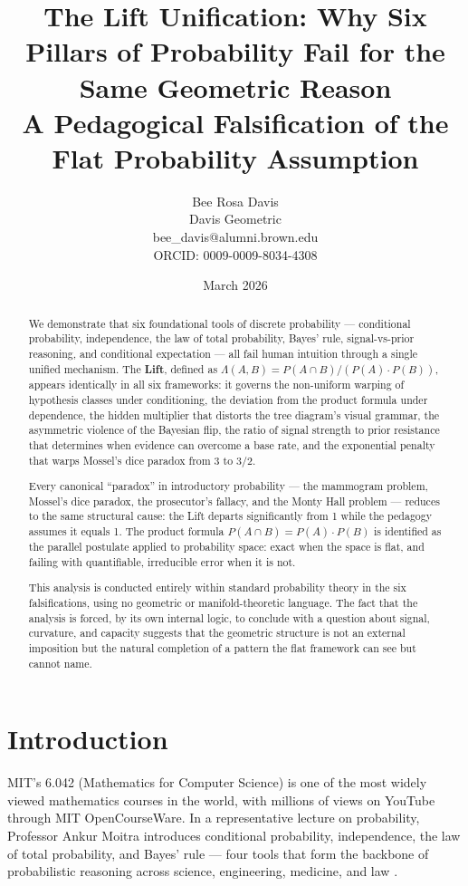 \documentclass[12pt]{article}
\title{\textbf{The Lift Unification: Why Six Pillars of Probability Fail for the Same Geometric Reason}\\[12pt]
\large A Pedagogical Falsification of the Flat Probability Assumption}
\author{Bee Rosa Davis\\
{\small Davis Geometric}\\
{\small bee\_davis@alumni.brown.edu}\\
{\small ORCID: 0009-0009-8034-4308}}
\date{March 2026}
\begin{document}
\maketitle

\begin{abstract}
We demonstrate that six foundational tools of discrete probability --- conditional probability, independence, the law of total probability, Bayes' rule, signal-vs-prior reasoning, and conditional expectation --- all fail human intuition through a single unified mechanism. The \textbf{Lift}, defined as $\Lambda(A,B) = P(A \cap B) / (P(A) \cdot P(B))$, appears identically in all six frameworks: it governs the non-uniform warping of hypothesis classes under conditioning, the deviation from the product formula under dependence, the hidden multiplier that distorts the tree diagram's visual grammar, the asymmetric violence of the Bayesian flip, the ratio of signal strength to prior resistance that determines when evidence can overcome a base rate, and the exponential penalty that warps Mossel's dice paradox from 3 to $3/2$.

Every canonical ``paradox'' in introductory probability --- the mammogram problem, Mossel's dice paradox, the prosecutor's fallacy, and the Monty Hall problem --- reduces to the same structural cause: the Lift departs significantly from 1 while the pedagogy assumes it equals 1. The product formula $P(A \cap B) = P(A) \cdot P(B)$ is identified as the parallel postulate applied to probability space: exact when the space is flat, and failing with quantifiable, irreducible error when it is not.

This analysis is conducted entirely within standard probability theory in the six falsifications, using no geometric or manifold-theoretic language. The fact that the analysis is forced, by its own internal logic, to conclude with a question about signal, curvature, and capacity suggests that the geometric structure is not an external imposition but the natural completion of a pattern the flat framework can see but cannot name.
\end{abstract}

\tableofcontents

\newpage

\section{Introduction}

MIT's 6.042 (Mathematics for Computer Science) is one of the most widely viewed mathematics courses in the world, with millions of views on YouTube through MIT OpenCourseWare. In a representative lecture on probability, Professor Ankur Moitra introduces conditional probability, independence, the law of total probability, and Bayes' rule --- four tools that form the backbone of probabilistic reasoning across science, engineering, medicine, and law \cite{moitra2024}.
\end{document}
